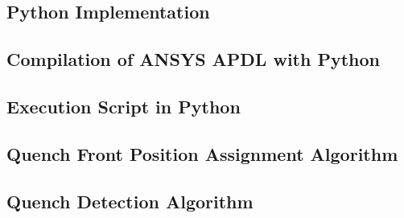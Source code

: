 \documentclass[11pt,a4paper]{report}
\begin{document}
\begin{appendices}
\clearpage
\chapter{Python Implementation}
\section{Compilation of ANSYS APDL with Python}
\label{appendix:python_ansys_compilation}


\section{Execution Script in Python}
\label{appendix:execution_script_python}


\section{Quench Front Position Assignment Algorithm}
\label{appendix:python_nodes_search_algorithm}


\section{Quench Detection Algorithm}
\label{appendix:python_quench_detection_algorithm}


\end{appendices}

\clearpage
% 
% 
% 
% 

% 
% 



\end{document}

